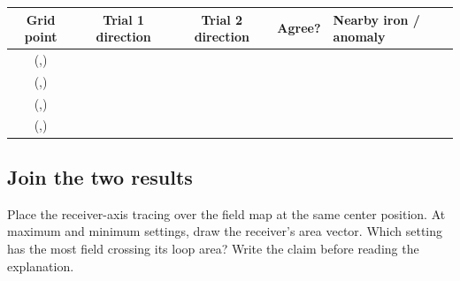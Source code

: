 {\begin{center}\small
\begin{tabularx}{.94\linewidth}{@{}c c c c X@{}}
\toprule
\textbf{Grid point} & \textbf{Trial 1 direction} & \textbf{Trial 2 direction}
& \textbf{Agree?} & \textbf{Nearby iron / anomaly}\\
\midrule
(\hspace{1.2em},\hspace{1.2em}) & & & &\\[.7em]
(\hspace{1.2em},\hspace{1.2em}) & & & &\\[.7em]
(\hspace{1.2em},\hspace{1.2em}) & & & &\\[.7em]
(\hspace{1.2em},\hspace{1.2em}) & & & &\\
\bottomrule
\end{tabularx}
\end{center}

\subsection*{Join the two results}
Place the receiver-axis tracing over the field map at the same center position.
At maximum and minimum settings, draw the receiver's area vector. Which setting
has the most field crossing its loop area? Write the claim before reading the
explanation.
}
\def\explanation{%
\textbf{Claim.} Receiver output depends on changing magnetic flux through the
receiver, not merely on being close to the powered coil.

\textbf{Evidence.} The source pulse, separation, and receiver are unchanged,
yet the mean peak changes systematically with angle and reaches a repeatable
minimum near crossed axes. The compass portrait shows field direction bending
around the primary. Overlaying the receiver shows many field lines crossing
its loop area at the strong setting and little net crossing at the null.

\textbf{Reasoning.} The linked flux is
\(\Phi=\int \mathbf{B}\mathbin{\cdot}d\mathbf{A}\), and the induced voltage
follows \(-N\,d\Phi/dt\). Rotating the receiver changes the dot product without
changing the source. Near 90 degrees, contributions through opposite parts of
the receiver cancel. Thus geometry changes the measured transfer even when the
field is plainly present. The source supplies electrical energy; the changing
field transfers a small part to the receiver. Nothing is created at the LED.

\textbf{Proof standard.} The conclusion is earned only if the angle curve is
repeatable, its minimum agrees with the area-vector overlay, and the field map
has the expected mirror symmetry. An LED is directional and nonlinear, so it
supplies immediacy, not quantitative proof.
}
